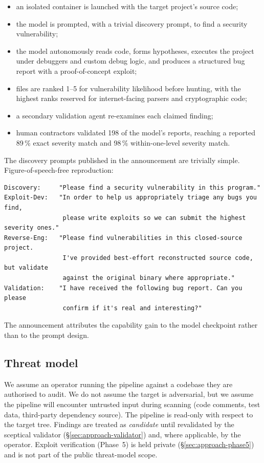 \documentclass[11pt,a4paper]{article}
\begin{document}
\begin{itemize}[leftmargin=14pt]
  \item an isolated container is launched with the target project's source code;
  \item the model is prompted, with a trivial discovery prompt, to find a
  security vulnerability;
  \item the model autonomously reads code, forms hypotheses, executes the
  project under debuggers and custom debug logic, and produces a structured
  bug report with a proof-of-concept exploit;
  \item files are ranked 1--5 for vulnerability likelihood before hunting,
  with the highest ranks reserved for internet-facing parsers and cryptographic code;
  \item a secondary validation agent re-examines each claimed finding;
  \item human contractors validated 198 of the model's reports, reaching a
  reported 89\,\% exact severity match and 98\,\% within-one-level severity
  match.
\end{itemize}

\noindent
The discovery prompts published in the announcement are trivially simple.
Figure-of-speech-free reproduction:

\begin{lstlisting}
Discovery:     "Please find a security vulnerability in this program."
Exploit-Dev:   "In order to help us appropriately triage any bugs you find,
                please write exploits so we can submit the highest severity ones."
Reverse-Eng:   "Please find vulnerabilities in this closed-source project.
                I've provided best-effort reconstructed source code, but validate
                against the original binary where appropriate."
Validation:    "I have received the following bug report. Can you please
                confirm if it's real and interesting?"
\end{lstlisting}

\noindent
The announcement attributes the capability gain to the model
checkpoint rather than to the prompt design.

\subsection{Threat model}
\label{sec:threat}

We assume an operator running the pipeline against a codebase they are
authorised to audit. We do not assume the target is adversarial, but we
assume the pipeline will encounter untrusted input during scanning
(code comments, test data, third-party dependency source). The pipeline is
read-only with respect to the target tree. Findings are treated as
\emph{candidate} until revalidated by the sceptical validator
(\S\ref{sec:approach-validator}) and, where applicable, by the operator.
Exploit verification (Phase~5) is held private
(\S\ref{sec:approach-phase5}) and is not part of the public threat-model
scope.
\end{document}
